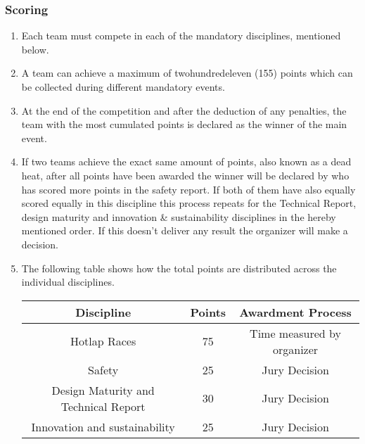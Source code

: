     \subsubsection{Scoring}
    \begin{enumerate}
      \item Each team must compete in each of the mandatory disciplines, mentioned below. 
      \item A team can achieve a maximum of twohundredeleven (155) points which can be collected during different mandatory events.
      \item At the end of the competition and after the deduction of any penalties, the team with the most cumulated points is declared as the winner of the main event. 
      \item If two teams achieve the exact same amount of points, also known as a dead heat, after all points have been awarded the winner will be declared by who has scored more points in the safety report. 
      If both of them have also equally scored equally in this discipline this process repeats for the Technical Report, design maturity and innovation \& sustainability disciplines in the hereby mentioned order. If this doesn't deliver any result the organizer will make a decision. 
      \item The following table shows how the total points are distributed across the individual disciplines. 

      \begin{center}
        \begin{tabular}{|c|c|c|} 
          \hline
          Discipline & Points & Awardment Process \\ 
          \hline
          Hotlap Races & 75 & Time measured by organizer \\ 
          \hline
          Safety & 25 & Jury Decision \\ 
          \hline
          Design Maturity and Technical Report & 30 & Jury Decision \\ 
          \hline
          Innovation and sustainability & 25 & Jury Decision \\ 
          \hline
        \end{tabular}
      \end{center}
    \end{enumerate}

